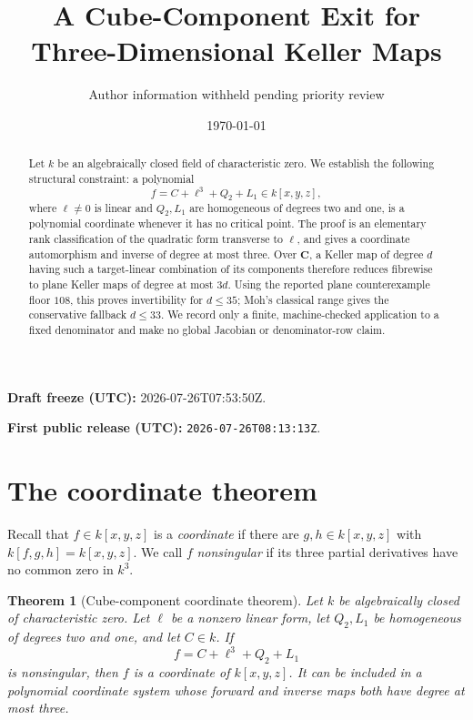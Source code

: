 \documentclass[11pt]{article}
\title{A Cube-Component Exit for Three-Dimensional Keller Maps}
\author{Author information withheld pending priority review}
\date{\today}
\newtheorem{theorem}{Theorem}
\newcommand{\C}{\mathbf C}
\begin{document}
\maketitle

\begin{abstract}
Let \(k\) be an algebraically closed field of characteristic zero.  We
establish the following structural constraint: a polynomial
\[
f=C+\ell^3+Q_2+L_1\in k[x,y,z],
\]
where \(\ell\ne0\) is linear and \(Q_2,L_1\) are homogeneous of degrees
two and one, is a polynomial coordinate whenever it has no critical
point.  The proof is an elementary rank classification of the
quadratic form transverse to \(\ell\), and gives a coordinate
automorphism and inverse of degree at most three.  Over \(\C\), a
Keller map of degree \(d\) having such a target-linear combination of
its components therefore reduces
fibrewise to plane Keller maps of degree at most \(3d\).  Using the
reported plane counterexample floor \(108\), this proves invertibility
for \(d\le35\); Moh's classical range gives the conservative fallback
\(d\le33\).  We record only a finite, machine-checked application to a
fixed denominator and make no global Jacobian or denominator-row
claim.
\end{abstract}

\noindent\textbf{Draft freeze (UTC):} 2026-07-26T07:53:50Z.
\par\noindent
\textbf{First public release (UTC):}
\texttt{2026-07-26T08:13:13Z}.

\section{The coordinate theorem}

Recall that \(f\in k[x,y,z]\) is a \emph{coordinate} if there are
\(g,h\in k[x,y,z]\) with \(k[f,g,h]=k[x,y,z]\).  We call \(f\)
\emph{nonsingular} if its three partial derivatives have no common
zero in \(k^3\).

\begin{theorem}[Cube-component coordinate theorem]\label{thm:coordinate}
Let \(k\) be algebraically closed of characteristic zero.  Let
\(\ell\) be a nonzero linear form, let \(Q_2,L_1\) be homogeneous of
degrees two and one, and let \(C\in k\).  If
\[
f=C+\ell^3+Q_2+L_1
\]
is nonsingular, then \(f\) is a coordinate of \(k[x,y,z]\).  It can be
included in a polynomial coordinate system whose forward and inverse
maps both have degree at most three.
\end{theorem}
\end{document}

